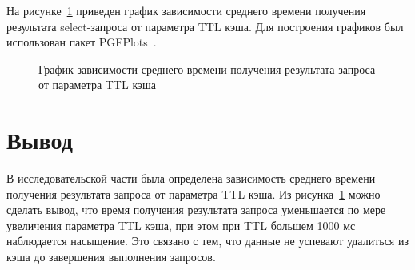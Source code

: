 На рисунке~\ref{ttl_time_graph} приведен график зависимости среднего времени получения результата select-запроса от параметра TTL кэша. Для построения графиков был использован пакет PGFPlots~\cite{pgfplots}.
\begin{figure}[H]
	\begin{center}
		\caption{\label{ttl_time_graph}График зависимости среднего времени получения результата запроса от параметра TTL кэша}
	\end{center}
\end{figure}

\section{Вывод}

В исследовательской части была определена зависимость среднего времени получения результата запроса от параметра TTL кэша.
Из рисунка~\ref{ttl_time_graph} можно сделать вывод, что время получения результата запроса уменьшается по мере увеличения параметра TTL кэша, при этом при TTL большем 1000 мс наблюдается насыщение.
Это связано с тем, что данные не успевают удалиться из кэша до завершения выполнения запросов.

\clearpage
